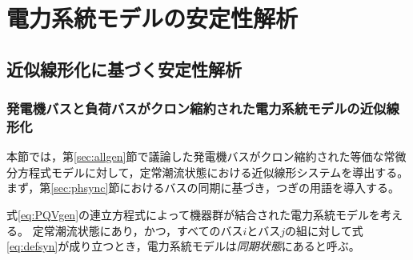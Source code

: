 \documentclass[tombow,dvipdfmx]{corona-a5}
\begin{document}
\chapter{電力系統モデルの安定性解析}\label{sec:staana}

\section{近似線形化に基づく安定性解析}\label{sec:stalin}

\subsection{発電機バスと負荷バスがクロン縮約された電力系統モデルの近似線形化}

本節では，第\ref{sec:allgen}節で議論した発電機バスがクロン縮約された等価な常微分方程式モデルに対して，定常潮流状態における近似線形システムを導出する。
まず，第\ref{sec:phsync}節におけるバスの同期に基づき，つぎの用語を導入する。

\begin{定義}\label{def:syncall}
式\ref{eq:PQVgen}の連立方程式によって機器群が結合された電力系統モデルを考える。
定常潮流状態にあり，かつ，すべてのバス$i$とバス$j$の組に対して式\ref{eq:defsyn}が成り立つとき，電力系統モデルは\emph{同期状態}にあると呼ぶ。
\end{定義}
\end{document}
